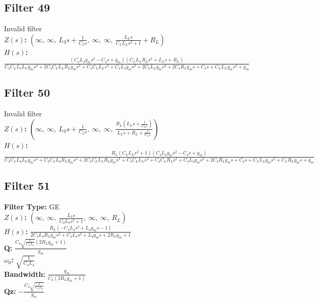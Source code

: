 \documentclass{article}
\begin{document}
\subsection*{Filter 49}
Invalid filter \\ 
\textbf{$Z(s)$:} $\left( \infty, \  \infty, \  L_{3} s + \frac{1}{C_{3} s}, \  \infty, \  \infty, \  \frac{L_{L} s}{C_{L} L_{L} s^{2} + 1} + R_{L}\right)$ \\ 
\textbf{$H(s)$:} $\frac{\left(C_{4} L_{4} g_{m} s^{2} - C_{4} s + g_{m}\right) \left(C_{L} L_{L} R_{L} s^{2} + L_{L} s + R_{L}\right)}{C_{4} C_{L} L_{4} L_{L} g_{m} s^{4} + 2 C_{4} C_{L} L_{L} R_{L} g_{m} s^{3} + C_{4} C_{L} L_{L} s^{3} + C_{4} L_{4} g_{m} s^{2} + 2 C_{4} L_{L} g_{m} s^{2} + 2 C_{4} R_{L} g_{m} s + C_{4} s + C_{L} L_{L} g_{m} s^{2} + g_{m}}$ \\ 
\subsection*{Filter 50}
Invalid filter \\ 
\textbf{$Z(s)$:} $\left( \infty, \  \infty, \  L_{3} s + \frac{1}{C_{3} s}, \  \infty, \  \infty, \  \frac{R_{L} \left(L_{L} s + \frac{1}{C_{L} s}\right)}{L_{L} s + R_{L} + \frac{1}{C_{L} s}}\right)$ \\ 
\textbf{$H(s)$:} $\frac{R_{L} \left(C_{L} L_{L} s^{2} + 1\right) \left(C_{4} L_{4} g_{m} s^{2} - C_{4} s + g_{m}\right)}{C_{4} C_{L} L_{4} L_{L} g_{m} s^{4} + C_{4} C_{L} L_{4} R_{L} g_{m} s^{3} + 2 C_{4} C_{L} L_{L} R_{L} g_{m} s^{3} + C_{4} C_{L} L_{L} s^{3} + C_{4} C_{L} R_{L} s^{2} + C_{4} L_{4} g_{m} s^{2} + 2 C_{4} R_{L} g_{m} s + C_{4} s + C_{L} L_{L} g_{m} s^{2} + C_{L} R_{L} g_{m} s + g_{m}}$ \\ 
\subsection*{Filter 51}
\textbf{Filter Type:} GE \\ 
\textbf{$Z(s)$:} $\left( \infty, \  \infty, \  \frac{L_{3} s}{C_{3} L_{3} s^{2} + 1}, \  \infty, \  \infty, \  R_{L}\right)$ \\ 
\textbf{$H(s)$:} $\frac{R_{L} \left(- C_{4} L_{4} s^{2} + L_{4} g_{m} s - 1\right)}{2 C_{4} L_{4} R_{L} g_{m} s^{2} + C_{4} L_{4} s^{2} + L_{4} g_{m} s + 2 R_{L} g_{m} + 1}$ \\ 
\textbf{Q:} $\frac{C_{4} \sqrt{\frac{1}{C_{4} L_{4}}} \left(2 R_{L} g_{m} + 1\right)}{g_{m}}$ \\ 
\textbf{$\omega_0$:} $\sqrt{\frac{1}{C_{4} L_{4}}}$ \\ 
\textbf{Bandwidth:} $\frac{g_{m}}{C_{4} \left(2 R_{L} g_{m} + 1\right)}$ \\ 
\textbf{Qz:} $- \frac{C_{4} \sqrt{\frac{1}{C_{4} L_{4}}}}{g_{m}}$ \\ 
\end{document}
